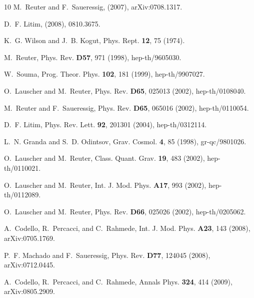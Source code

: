 \documentclass[preprint,preprintnumbers,amsmath,amssymb,nofootinbib,APS]{revtex4}
\newcommand{\2}{\sqrt{2\,}}
\begin{document}
\begin{thebibliography}{10}
M.~Reuter and F.~Saueressig,
\newblock (2007), arXiv:0708.1317.

D.~F. Litim,
\newblock (2008), 0810.3675.

K.~G. Wilson and J.~B. Kogut,
\newblock Phys. Rept. {\bf 12}, 75 (1974).

M.~Reuter,
\newblock Phys. Rev. {\bf D57}, 971 (1998), hep-th/9605030.

W.~Souma,
\newblock Prog. Theor. Phys. {\bf 102}, 181 (1999), hep-th/9907027.

O.~Lauscher and M.~Reuter,
\newblock Phys. Rev. {\bf D65}, 025013 (2002), hep-th/0108040.

M.~Reuter and F.~Saueressig,
\newblock Phys. Rev. {\bf D65}, 065016 (2002), hep-th/0110054.

D.~F. Litim,
\newblock Phys. Rev. Lett. {\bf 92}, 201301 (2004), hep-th/0312114.

L.~N. Granda and S.~D. Odintsov,
\newblock Grav. Cosmol. {\bf 4}, 85 (1998), gr-qc/9801026.

O.~Lauscher and M.~Reuter,
\newblock Class. Quant. Grav. {\bf 19}, 483 (2002), hep-th/0110021.

O.~Lauscher and M.~Reuter,
\newblock Int. J. Mod. Phys. {\bf A17}, 993 (2002), hep-th/0112089.

O.~Lauscher and M.~Reuter,
\newblock Phys. Rev. {\bf D66}, 025026 (2002), hep-th/0205062.

A.~Codello, R.~Percacci, and C.~Rahmede,
\newblock Int. J. Mod. Phys. {\bf A23}, 143 (2008), arXiv:0705.1769.

P.~F. Machado and F.~Saueressig,
\newblock Phys. Rev. {\bf D77}, 124045 (2008), arXiv:0712.0445.

A.~Codello, R.~Percacci, and C.~Rahmede,
\newblock Annals Phys. {\bf 324}, 414 (2009), arXiv:0805.2909.


\end{thebibliography}
\end{document}

